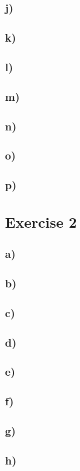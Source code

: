 \documentclass[12pt]{article}
\begin{document}
\subsection*{j)}
\label{sub:j)}

\subsection*{k)}
\label{sub:k)}

\subsection*{l)}
\label{sub:l)}

\subsection*{m)}
\label{sub:m)}

\subsection*{n)}
\label{sub:n)}

\subsection*{o)}
\label{sub:o)}

\subsection*{p)}
\label{sub:p)}

\section*{Exercise 2}

\subsection*{a)}
\label{sub:a)}

\subsection*{b)}
\label{sub:b)}

\subsection*{c)}
\label{sub:c)}

\subsection*{d)}
\label{sub:d)}

\subsection*{e)}
\label{sub:e)}

\subsection*{f)}
\label{sub:f)}

\subsection*{g)}
\label{sub:g)}

\subsection*{h)}
\label{sub:h)}
\end{document}

